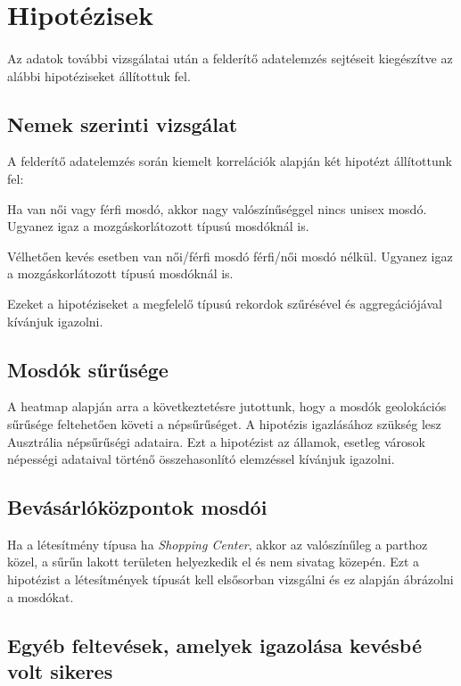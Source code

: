	\section{Hipotézisek}
	\paragraph{}
	Az adatok további vizsgálatai után a felderítő adatelemzés sejtéseit kiegészítve az alábbi hipotéziseket állítottuk fel. 
	\subsection{Nemek szerinti vizsgálat}
	A felderítő adatelemzés során kiemelt korrelációk alapján két hipotézt állítottunk fel:
	\begin{compactlist}			
		\item Ha van női vagy férfi mosdó, akkor nagy valószínűséggel nincs unisex mosdó. Ugyanez igaz a mozgáskorlátozott típusú mosdóknál is.
		\item Vélhetően kevés esetben van női/férfi mosdó férfi/női mosdó nélkül. Ugyanez igaz a mozgáskorlátozott típusú mosdóknál is.
	\end{compactlist}
	Ezeket a hipotéziseket a megfelelő típusú rekordok szűrésével és aggregációjával kívánjuk igazolni.\par
	\subsection{Mosdók sűrűsége}
	A heatmap alapján arra a következtetésre jutottunk, hogy a mosdók geolokációs sűrűsége feltehetően követi a népsűrűséget. A hipotézis igazlásához szükség lesz Ausztrália népsűrűségi adataira. Ezt a hipotézist az államok, esetleg városok népességi adataival történő összehasonlító elemzéssel kívánjuk igazolni.
	\subsection{Bevásárlóközpontok mosdói}
	Ha a létesítmény típusa ha \textit{Shopping Center}, akkor az valószínűleg a parthoz közel, a sűrűn lakott területen helyezkedik el és nem sivatag közepén. Ezt a hipotézist a létesítmények típusát kell elsősorban vizsgálni és ez alapján ábrázolni a mosdókat.
	\subsection{Egyéb feltevések, amelyek igazolása kevésbé volt sikeres}
